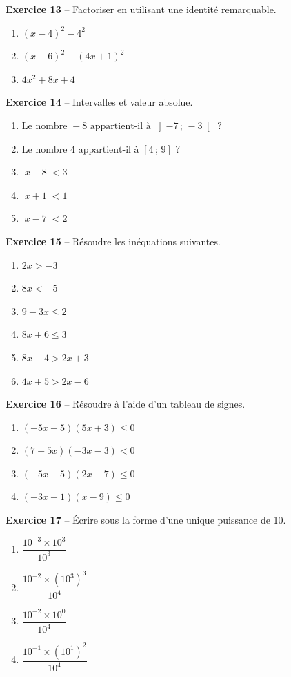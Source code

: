 \documentclass[12pt,a4paper,french]{article}
\begin{document}
\noindent\textbf{Exercice 13} -- Factoriser en utilisant une identité remarquable.
\begin{enumerate}
\item $(x - 4)^2 - 4^2$
\item $(x - 6)^2 - (4x + 1)^2$
\item $4x^2 + 8x + 4$
\end{enumerate}
\bigskip

\noindent\textbf{Exercice 14} -- Intervalles et valeur absolue.
\begin{enumerate}
\item $\text{Le nombre } -8 \text{ appartient-il à } \left] -7 \,;\, -3 \right[ \text{ ?}$
\item $\text{Le nombre } 4 \text{ appartient-il à } \left[ 4 \,;\, 9 \right] \text{ ?}$
\item $|x - 8| < 3$
\item $|x + 1| < 1$
\item $|x - 7| < 2$
\end{enumerate}
\bigskip

\noindent\textbf{Exercice 15} -- Résoudre les inéquations suivantes.
\begin{enumerate}
\item $2 x > -3$
\item $8 x < -5$
\item $9 - 3 x \leq 2$
\item $8 x + 6 \leq 3$
\item $8 x - 4 > 2 x + 3$
\item $4 x + 5 > 2 x - 6$
\end{enumerate}
\bigskip

\noindent\textbf{Exercice 16} -- Résoudre à l'aide d'un tableau de signes.
\begin{enumerate}
\item $\left(- 5 x - 5\right) \left(5 x + 3\right) \leq 0$
\item $\left(7 - 5 x\right) \left(- 3 x - 3\right) < 0$
\item $\left(- 5 x - 5\right) \left(2 x - 7\right) \leq 0$
\item $\left(- 3 x - 1\right) \left(x - 9\right) \leq 0$
\end{enumerate}
\bigskip

\noindent\textbf{Exercice 17} -- Écrire sous la forme d'une unique puissance de 10.
\begin{enumerate}
\item $\dfrac{10^{-3} \times 10^{3}}{10^{3}}$
\item $\dfrac{10^{-2} \times (10^{3})^{3}}{10^{4}}$
\item $\dfrac{10^{-2} \times 10^{0}}{10^{4}}$
\item $\dfrac{10^{-1} \times (10^{1})^{2}}{10^{4}}$
\end{enumerate}
\bigskip
\end{document}
